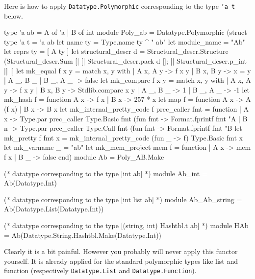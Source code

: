 \begin{example}
Here is how to apply \texttt{Datatype.Polymorphic} corresponding to the type
\texttt{'a t} below.
\begin{ocamlcode}
type 'a ab = A of 'a | B of int
module Poly_ab =
  Datatype.Polymorphic
    (struct
       type 'a t = 'a ab
       let name ty = Type.name ty ^ " ab"
       let module_name = "Ab"
       let reprs ty = [ A ty ]
       let structural_descr d =
         Structural_descr.Structure
          (Structural_descr.Sum
            [| [| Structural_descr.pack d |]; [| Structural_descr.p_int |] |]
       let mk_equal f x y = match x, y with
         | A x, A y -> f x y
         | B x, B y -> x = y
         | A _, B _ | B _, A _ -> false
       let mk_compare f x y =  match x, y with
         | A x, A y -> f x y
         | B x, B y -> Stdlib.compare x y
         | A _, B _ -> 1
         | B _, A _ -> -1
      let mk_hash f = function A x -> f x | B x -> 257 * x
      let map f = function A x -> A (f x) | B x -> B x
      let mk_internal_pretty_code f prec_caller fmt = function
        | A x ->
          Type.par
            prec_caller
            Type.Basic
            fmt
            (fun fmt -> Format.fprintf fmt "A %
        | B n ->
          Type.par
            prec_caller
            Type.Call
            fmt
            (fun fmt -> Format.fprintf fmt "B %
      let mk_pretty f fmt x =
        mk_internal_pretty_code (fun _ -> f) Type.Basic fmt x
      let mk_varname _ = "ab"
      let mk_mem_project mem f = function
        | A x -> mem f x
        | B _ -> false
     end)
module Ab = Poly_AB.Make

(* datatype corresponding to the type [int ab] *)
module Ab_int = Ab(Datatype.Int)

(* datatype corresponding to the type [int list ab] *)
module Ab_Ab_string = Ab(Datatype.List(Datatype.Int))

(* datatype corresponding to the type [(string, int) Hashtbl.t ab] *)
module HAb = Ab(Datatype.String.Hashtbl.Make(Datatype.Int))
\end{ocamlcode}
\end{example}
Clearly it is a bit painful. However you probably will never apply this
functor yourself. It is already applied for the standard \ocaml polymorphic
types like list and function (respectively
\texttt{Datatype.List} and
\texttt{Datatype.Function}).

